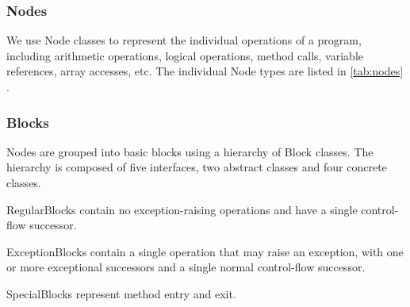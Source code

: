 \subsubsection{Nodes}
\label{sec:node_classes}

    We use Node classes to represent the individual operations of a program, including arithmetic operations, logical operations, method calls, variable references, array accesses, etc.  The individual Node types are listed in \autoref{tab:nodes} .


\subsubsection{Blocks}
\label{sec:block_classes}

    Nodes are grouped into basic blocks using a hierarchy of Block classes.  The hierarchy is composed of five interfaces, two abstract classes and four concrete classes.  

    



    RegularBlocks contain no exception-raising operations and have a single control-flow successor.

        
        
    ExceptionBlocks contain a single operation that may raise an exception, with one or more exceptional successors and a single normal control-flow successor.
            

        
    SpecialBlocks represent method entry and exit.

